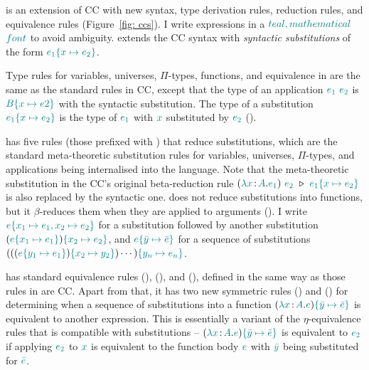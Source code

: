 {\ccs} is an extension of CC with new syntax, type derivation rules, reduction rules, and equivalence rules (Figure~\ref{fig: ccs}). I write {\ccs} expressions in a $\helper{teal, mathematical}$ $\helper{font}$ to avoid ambiguity. {\ccs} extends the CC syntax with \textit{syntactic substitutions} of the form $\helper{e_1\hsub{e_2}{x}}$. 

Type rules for variables, universes, $\Pi$-types, functions, and equivalence in {\ccs} are the same as the standard rules in CC, except that the type of an application $\helper{e_1} \ \helper{e_2}$ is $\helper{B\hsub{e2}{x}}$ with the syntactic substitution.
The type of a substitution $\helper{e_1\hsub{e_2}{x}}$ is the type of $\helper{e_1}$ with $\helper{x}$ substituted by $\helper{e_2}$ (). 

{\ccs} has five rules (those prefixed with ) that reduce substitutions, which are the standard meta-theoretic substitution rules for variables, universes, $\Pi$-types, and applications being internalised into the language. Note that the meta-theoretic substitution in the CC's original beta-reduction rule $(\helper{\lambda x} \goodcolon \helper{A} . \helper{e_1})\ \helper{e_2}\ \triangleright\ \helper{e_1\hsub{e_2}{x}}$ is also replaced by the syntactic one. {\ccs} does not reduce substitutions into functions, but it $\beta$-reduces them when they are applied to arguments (). I write $\helper{e}\helper{\{x_1 \mapsto e_1, x_2 \mapsto e_2\}}$ for a substitution followed by another substitution $(\helper{e}\hsub{e_1}{x_1})\hsub{e_2}{x_2}$, and $\helper{e}\hsub{\bar{e}}{\bar{y}}$ for a sequence of substitutions
$(((\helper{e}\hsub{e_1}{y_1})\hsub{y_2}{x_2}) \cdots )\hsub{e_n}{y_n}$.

{\ccs} has standard equivalence rules (), (), and (), defined in the same way as those rules in are CC. Apart from that, it has two new symmetric rules () and () for determining when a sequence of substitutions into a function 
$(\helper{\lambda x} \goodcolon \helper{A} . \helper{e})\helper{\hsub{\bar{e}}{\bar{y}}}$ 
is equivalent to another expression. This is essentially a variant of the $\eta$-equivalence rules that is compatible with substitutions -- $(\helper{\lambda x} \goodcolon \helper{A} . \helper{e})\helper{\hsub{\bar{e}}{\bar{y}}}$ is equivalent to $\helper{e_2}$ if applying $\helper{e_2}$ to $\helper{x}$ is equivalent to the function body $\helper{e}$ with $\helper{\bar{y}}$ being substituted for $\helper{\bar{e}}$.

